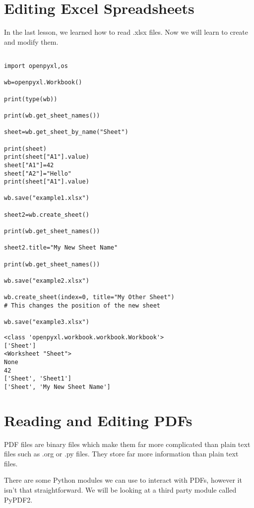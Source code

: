 \documentclass[11pt]{article}
\begin{document}
\section{Editing Excel Spreadsheets}
\label{sec:org19903a4}

In the last lesson, we learned how to read .xlsx files. Now we will learn to create and modify them.

\begin{verbatim}

import openpyxl,os

wb=openpyxl.Workbook()

print(type(wb))

print(wb.get_sheet_names())

sheet=wb.get_sheet_by_name("Sheet")

print(sheet)
print(sheet["A1"].value)
sheet["A1"]=42
sheet["A2"]="Hello"
print(sheet["A1"].value)

wb.save("example1.xlsx")

sheet2=wb.create_sheet()

print(wb.get_sheet_names())

sheet2.title="My New Sheet Name"

print(wb.get_sheet_names())

wb.save("example2.xlsx")

wb.create_sheet(index=0, title="My Other Sheet")
# This changes the position of the new sheet

wb.save("example3.xlsx")

\end{verbatim}

\begin{verbatim}
<class 'openpyxl.workbook.workbook.Workbook'>
['Sheet']
<Worksheet "Sheet">
None
42
['Sheet', 'Sheet1']
['Sheet', 'My New Sheet Name']
\end{verbatim}

\section{Reading and Editing PDFs}
\label{sec:org75aa3c8}

PDF files are binary files which make them far more complicated than plain text files such as .org or .py files. They store far more information than plain text files.

There are some Python modules we can use to interact with PDFs, however it isn't that straightforward. We will be looking at a third party module called PyPDF2.
\end{document}
